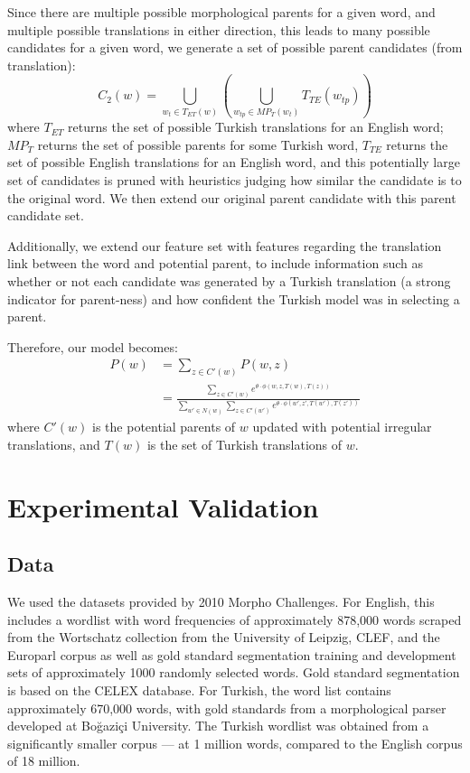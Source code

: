 \documentclass[11pt,twocolumn]{article}
\begin{document}
Since there are multiple possible morphological parents for a given word, and multiple
possible translations in either direction, this leads to many possible candidates for a given word,
we generate a set of possible parent candidates (from translation):
\begin{equation}
    C_2(w) = \bigcup_{w_t \in T_{ET}(w)}\left(\bigcup_{w_{tp} \in MP_T (w_t)} T_{TE}(w_{tp})\right)
\end{equation}
where $T_{ET}$ returns the set of possible Turkish translations
for an English word; $MP_T$ returns the set of possible parents for some Turkish word,
$T_{TE}$ returns the set of possible English translations for an English word,
and this potentially large set of candidates is pruned with heuristics judging
how similar the candidate is to the original word. We then extend our original parent candidate
with this parent candidate set.

Additionally, we extend our feature set with features regarding the translation link between
the word and potential parent, to include information such as whether or not each candidate was
generated by a Turkish translation (a strong indicator for parent-ness) and how confident
the Turkish model was in selecting a parent.

Therefore, our model becomes:
\begin{equation}
    \begin{split}
        P(w) &= \sum_{z \in C'(w)} P(w,z) \\
             &= \frac{\sum_{z \in C'(w)} e^{\theta \cdot \phi(w, z, T(w), T(z))}}{\sum_{w' \in N(w)} \sum_{z \in C'(w')} e^{\theta \cdot \phi(w', z', T(w'), T(z'))}}
    \end{split}
\end{equation}
where $C'(w)$ is the potential parents of $w$ updated with potential irregular translations,
and $T(w)$ is the set of Turkish translations of $w$.

\section{Experimental Validation}

\subsection{Data}

We used the datasets provided by 2010 Morpho Challenges. For English, this includes
a wordlist with word frequencies of approximately 878,000 words scraped from the
Wortschatz collection from the University of Leipzig, CLEF, and the Europarl corpus
as well as gold standard segmentation training and development sets of approximately 
1000 randomly selected words. Gold standard segmentation is based on the CELEX database.
For Turkish, the word list contains approximately 670,000 words, with gold standards
from a morphological parser developed at Boğaziçi University. The Turkish wordlist
was obtained from a significantly smaller corpus --- at 1 million words, compared
to the English corpus of 18 million.
\end{document}

